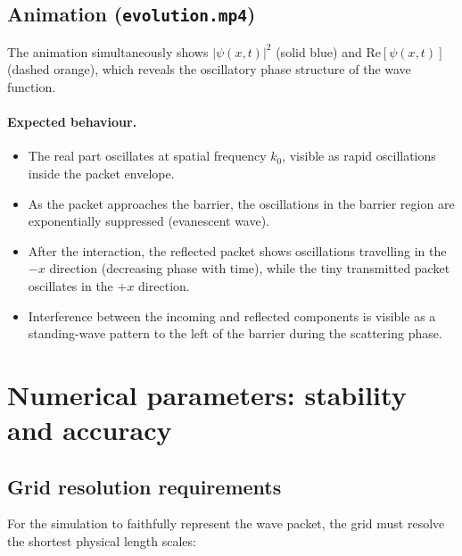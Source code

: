 \documentclass[12pt, a4paper]{article}
\begin{document}
\subsection{Animation (\texttt{evolution.mp4})}

The animation simultaneously shows $|\psi(x,t)|^2$ (solid blue) and
$\mathrm{Re}[\psi(x,t)]$ (dashed orange), which reveals the oscillatory
phase structure of the wave function.

\paragraph{Expected behaviour.}
\begin{itemize}
  \item The real part oscillates at spatial frequency $k_0$, visible as
        rapid oscillations inside the packet envelope.
  \item As the packet approaches the barrier, the oscillations in the
        barrier region are exponentially suppressed (evanescent wave).
  \item After the interaction, the reflected packet shows oscillations
        travelling in the $-x$ direction (decreasing phase with time),
        while the tiny transmitted packet oscillates in the $+x$ direction.
  \item Interference between the incoming and reflected components is
        visible as a standing-wave pattern to the left of the barrier
        during the scattering phase.
\end{itemize}

\section{Numerical parameters: stability and accuracy}

\subsection{Grid resolution requirements}

For the simulation to faithfully represent the wave packet, the grid
must resolve the shortest physical length scales:
\end{document}
